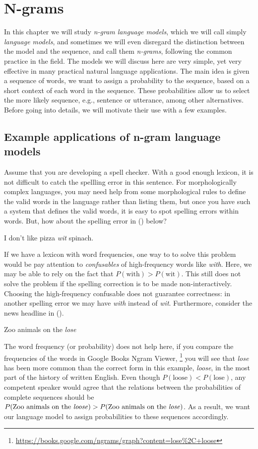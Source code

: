 \chapter{\label{chap:ngram}N-grams}

In this chapter we will study \emph{n-gram language models},
which we will call simply \emph{language models},
and sometimes we will even disregard
the distinction between the model and the sequence,
and call them \emph{n-grams}, following the common practice in the field.
The models we will discuss here are very simple,
yet very effective in many practical natural language applications.
The main idea is given a sequence of words,
we want to assign a probability to the sequence,
based on a short context of each word in the sequence.
These probabilities allow us to select the more likely sequence,
e.g., sentence or utterance, among other alternatives.
Before going into details,
we will motivate their use with a few examples.

\section{Example applications of n-gram language models}
Assume that you are developing a spell checker.
With a good enough lexicon,
it is not difficult to catch the spellling error in this sentence.
For morphologically complex languages,
you may need help from some morphological rules
to define the valid words in the language rather than listing them,
but once you have such a system that defines the valid words,
it is easy to spot spelling errors within words.
But, how about the spelling error in () below?

  I don't like pizza \emph{wit} spinach.
\xe

If we have a lexicon with word frequencies,
one way to to solve this problem would
be pay attention to \emph{confusables} of high-frequency words like \emph{with}.
Here, we may be able to rely on the fact that $P(\text{with}) > P(\text{wit})$.
This still does not solve the problem if the spelling correction is to be made non-interactively.
Choosing the high-frequency confusable does not guarantee correctness:
in another spelling error we may have \emph{with} instead of \emph{wit}.
Furthermore,
consider the news headline in ().

  Zoo animals on the \emph{lose}
\xe

The word frequency (or probability) does not help here,
if you compare the frequencies of the words in Google Books Ngram Viewer,%
\footnote{\url{https://books.google.com/ngrams/graph?content=lose\%2C+loose}}
you will see that \emph{lose} has been more common
than the correct form in this example, \emph{loose},
in the most part of the history of written English.
Even though $P(\text{loose}) < P(\text{lose})$,
any competent speaker would agree that the relations between
the probabilities of complete sequences should be 
$P(\text{Zoo animals on the \emph{loose}}) > P(\text{Zoo animals on the \emph{lose}})$.
As a result,
we want our language model to assign probabilities to these sequences accordingly.


